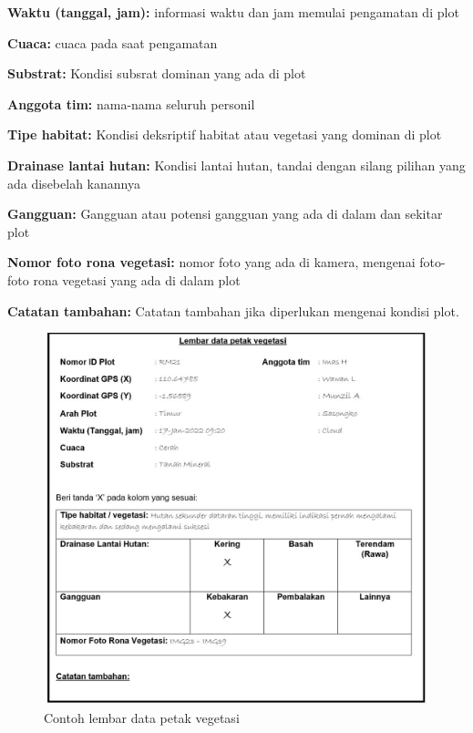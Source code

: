 \documentclass[
]{book}
\begin{document}
\textbf{Waktu (tanggal, jam):} informasi waktu dan jam memulai pengamatan di plot

\textbf{Cuaca:} cuaca pada saat pengamatan

\textbf{Substrat:} Kondisi subsrat dominan yang ada di plot

\textbf{Anggota tim:} nama-nama seluruh personil

\textbf{Tipe habitat:} Kondisi deksriptif habitat atau vegetasi yang dominan di plot

\textbf{Drainase lantai hutan:} Kondisi lantai hutan, tandai dengan silang pilihan yang ada disebelah kanannya

\textbf{Gangguan:} Gangguan atau potensi gangguan yang ada di dalam dan sekitar plot

\textbf{Nomor foto rona vegetasi:} nomor foto yang ada di kamera, mengenai foto-foto rona vegetasi yang ada di dalam plot

\textbf{Catatan tambahan:} Catatan tambahan jika diperlukan mengenai kondisi plot.

\begin{figure}

{\centering \includegraphics[width=1\linewidth]{images/ldv_ip} 

}

\caption{Contoh lembar data petak vegetasi}\label{fig:ldvip}
\end{figure}
\end{document}
